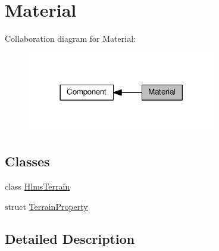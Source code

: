 \hypertarget{group___material}{}\section{Material}
\label{group___material}
Collaboration diagram for Material\+:\nopagebreak
\begin{figure}[H]
\begin{center}
\leavevmode
\includegraphics[width=234pt]{group___material}
\end{center}
\end{figure}
\subsection*{Classes}
\begin{DoxyCompactItemize}
\item 
class \hyperlink{class_hlms_terrain}{Hlms\+Terrain}
\item 
struct \hyperlink{struct_terrain_property}{Terrain\+Property}
\end{DoxyCompactItemize}


\subsection{Detailed Description}
